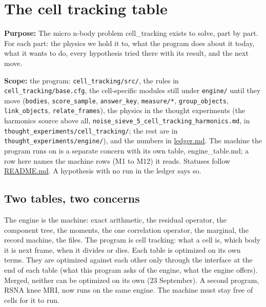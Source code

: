 \chapter{\texorpdfstring{The cell tracking table}{The cell tracking table}}
\label{chap:cell-tracking-table}

\textbf{Purpose:} The micro n-body problem cell\_\allowbreak{}tracking exists to solve, part by part. For each part: the physics we hold it to, what the program does about it today, what it wants to do, every hypothesis tried there with its result, and the next move.

\textbf{Scope:} the program: \texttt{cell\_\allowbreak{}tracking/\allowbreak{}src/\allowbreak{}}, the rules in \texttt{cell\_\allowbreak{}tracking/\allowbreak{}base.\allowbreak{}cfg}, the cell-specific modules still under \texttt{engine/\allowbreak{}} until they move (\texttt{bodies}, \texttt{score\_\allowbreak{}sample}, \texttt{answer\_\allowbreak{}key}, \texttt{measure/\allowbreak{}*}, \texttt{group\_\allowbreak{}objects}, \texttt{link\_\allowbreak{}objects}, \texttt{relate\_\allowbreak{}frames}), the physics in the thought experiments (the harmonics source above all, \texttt{noise\_\allowbreak{}sieve\_\allowbreak{}5\_\allowbreak{}cell\_\allowbreak{}tracking\_\allowbreak{}harmonics.\allowbreak{}md}, in \texttt{thought\_\allowbreak{}experiments/\allowbreak{}cell\_\allowbreak{}tracking/\allowbreak{}}; the rest are in \texttt{thought\_\allowbreak{}experiments/\allowbreak{}engine/\allowbreak{}}), and the numbers in \hyperref[chap:ledger]{ledger.md}. The machine the program runs on is a separate concern with its own table, engine\_\allowbreak{}table.md; a row here names the machine rows (M1 to M12) it reads. Statuses follow \hyperref[chap:readme]{README.md}. A hypothesis with no run in the ledger says so.

\section{\texorpdfstring{Two tables, two concerns}{Two tables, two concerns}}

The engine is the machine: exact arithmetic, the residual operator, the component tree, the moments, the one correlation operator, the marginal, the record machine, the files. The program is cell tracking: what a cell is, which body it is next frame, when it divides or dies. Each table is optimized on its own terms. They are optimized against each other only through the interface at the end of each table (what this program asks of the engine, what the engine offers). Merged, neither can be optimized on its own (23 September). A second program, RSNA knee MRI, now runs on the same engine. The machine must stay free of cells for it to run.

